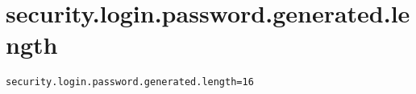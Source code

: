 \section{security.login.password.generated.length}
\label{configuration:SecurityLoginPasswordGeneratedLength}
\ClearAPI
\TODO
{}
\begin{lstlisting}[style=Props,caption={Usage example for \textit{security.login.password.generated.length}}]
security.login.password.generated.length=16
\end{lstlisting}